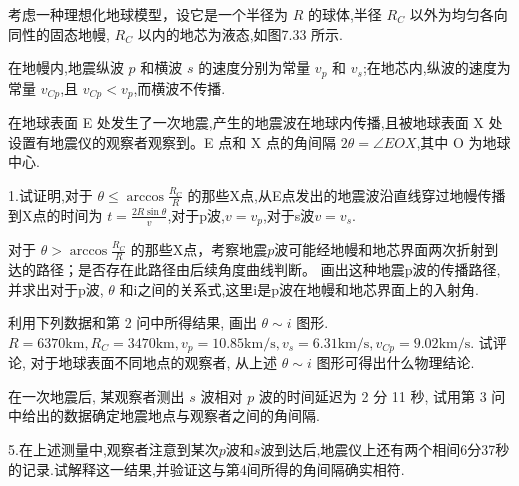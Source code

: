 \documentclass[UTF8,fontset=fandol,a4paper,11pt]{ctexart}
\newcommand{\tagline}[1]{\noindent{\small\color{muted}#1}\par}
\newcommand{\figcaption}[1]{\par\vspace{2pt}{\small\color{muted}#1}\par}
\begin{document}
\tagline{M-07-33}

考虑一种理想化地球模型，设它是一个半径为 \(R\) 的球体,半径 \(R_{C}\)
以外为均匀各向同性的固态地幔, \(R_{C}\) 以内的地芯为液态,如图7.33 所示.

在地幔内,地震纵波 \(p\) 和横波 \(s\) 的速度分别为常量 \(v_{p}\) 和
\(v_{s}\);在地芯内,纵波的速度为常量 \(v_{Cp}\),且
\(v_{Cp} < v_{p}\),而横波不传播.

在地球表面 E 处发生了一次地震,产生的地震波在地球内传播,且被地球表面 X
处设置有地震仪的观察者观察到。E 点和 X 点的角间隔
\(2\theta=\angle E O X\),其中 O 为地球中心.

1.试证明,对于 \(\theta \leqslant \arccos \frac{R_{C}}{R}\)
的那些X点,从E点发出的地震波沿直线穿过地幔传播到X点的时间为
\(t=\frac{2 R \sin \theta}{v}\),对于p波,\(v=v_{p}\),对于s波\(v=v_{s}\).

对于 \(\theta>\arccos \frac{R_{C}}{R}\)
的那些X点，考察地震$p$波可能经地幔和地芯界面两次折射到达的路径；是否存在此路径由后续角度曲线判断。
画出这种地震p波的传播路径,并求出对于p波, \(\theta\)
和i之间的关系式,这里i是p波在地幔和地芯界面上的入射角.

利用下列数据和第 2 问中所得结果, 画出 \(\theta \sim i\) 图形.
\(R=6370 \mathrm{km}, R_{C}=3470 \mathrm{km}, v_{p}=10.85 \mathrm{km} / \mathrm{s}, v_{s}=6.31 \mathrm{km} / \mathrm{s}, v_{C p}=9.02 \mathrm{km} / \mathrm{s}\).
试评论, 对于地球表面不同地点的观察者, 从上述 \(\theta \sim i\)
图形可得出什么物理结论.

在一次地震后, 某观察者测出 \(s\) 波相对 \(p\) 波的时间延迟为 2 分 11 秒,
试用第 3 问中给出的数据确定地震地点与观察者之间的角间隔.

5.在上述测量中,观察者注意到某次\(p\)波和\(s\)波到达后,地震仪上还有两个相间6分37秒的记录.试解释这一结果,并验证这与第4间所得的角间隔确实相符.

\begin{center}\begin{minipage}{\linewidth}\centering{}\figcaption{图 7.33}\end{minipage}\end{center}
\end{document}
